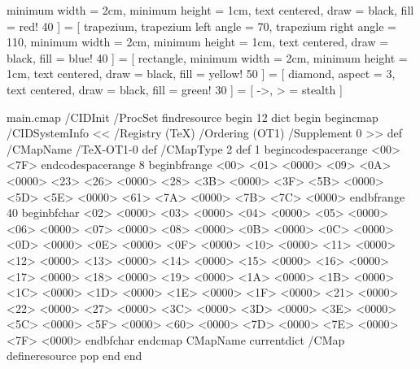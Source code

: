 	minimum width = 2cm, 
	minimum height = 1cm, 
	text centered, 
	draw = black, 
	fill = red! 40
]
 = 
[	trapezium, 
	trapezium left angle = 70, 
	trapezium right angle = 110, 
	minimum width = 2cm, 
	minimum height = 1cm, 
	text centered, 
	draw = black, 
	fill = blue! 40
]
 = 
[	rectangle, 
	minimum width = 2cm, 
	minimum height = 1cm, 
	text centered, 
	draw = black, 
	fill = yellow! 50
]
 = 
[	diamond, 
	aspect = 3, 
	text centered, 
	draw = black, 
	fill = green! 30
]
 = 
[	->, 
	> = stealth
]
\newcommand{\drawbarcode}[1]{\EANisbn[SC5a, ISBN = #1]}
\renewcommand{\thefootnote}{\fnsymbol{footnote}}
\usepackage{accsupp}
\usepackage[resetfonts]{cmap}
\usepackage{fancyvrb}
\begin{VerbatimOut}{main.cmap}
	/CIDInit /ProcSet findresource begin
	12 dict begin
	begincmap
	/CIDSystemInfo
	<< /Registry (TeX)
	/Ordering (OT1)
	/Supplement 0
	>> def
	/CMapName /TeX-OT1-0 def
	/CMapType 2 def
	1 begincodespacerange
	<00> <7F>
	endcodespacerange
	8 beginbfrange
	<00> <01> <0000>
	<09> <0A> <0000>
	<23> <26> <0000>
	<28> <3B> <0000>
	<3F> <5B> <0000>
	<5D> <5E> <0000>
	<61> <7A> <0000>
	<7B> <7C> <0000>
	endbfrange
	40 beginbfchar
	<02> <0000>
	<03> <0000>
	<04> <0000>
	<05> <0000>
	<06> <0000>
	<07> <0000>
	<08> <0000>
	<0B> <0000>
	<0C> <0000>
	<0D> <0000>
	<0E> <0000>
	<0F> <0000>
	<10> <0000>
	<11> <0000>
	<12> <0000>
	<13> <0000>
	<14> <0000>
	<15> <0000>
	<16> <0000>
	<17> <0000>
	<18> <0000>
	<19> <0000>
	<1A> <0000>
	<1B> <0000>
	<1C> <0000>
	<1D> <0000>
	<1E> <0000>
	<1F> <0000>
	<21> <0000>
	<22> <0000>
	<27> <0000>
	<3C> <0000>
	<3D> <0000>
	<3E> <0000>
	<5C> <0000>
	<5F> <0000>
	<60> <0000>
	<7D> <0000>
	<7E> <0000>
	<7F> <0000>
	endbfchar
	endcmap
	CMapName currentdict /CMap defineresource pop
	end
	end
\end{VerbatimOut}
\makeatother
